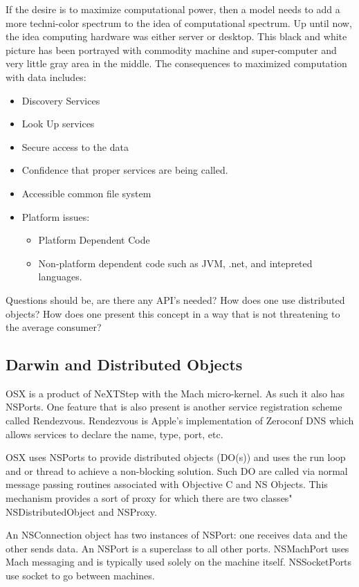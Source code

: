 \documentclass[11pt]{article}
\begin{document}
If the desire is to maximize computational power, then a model needs to add a more techni-color spectrum to the idea of computational spectrum.  Up until now, the idea computing hardware was either server or desktop.   This black and white picture has been portrayed with commodity machine and super-computer and very little gray area in the middle.    The consequences to maximized computation with data includes:
\begin{itemize}
\item Discovery Services 
\item Look Up services 
\item Secure access to the data
\item Confidence that proper services are being called.
\item Accessible common file system
\item Platform issues:
\begin{itemize}
\item Platform Dependent Code
\item Non-platform dependent code such as JVM, .net, and intepreted languages.  
\end{itemize}
\end{itemize}

Questions should be, are there any API's needed?  How does one use distributed objects?  How does one present this concept in a way that is not threatening to the average consumer?

\subsection {Darwin and Distributed Objects}
OSX is a product of NeXTStep with the Mach micro-kernel.  As such it also has NSPorts.  One feature that is also present is another service registration scheme called Rendezvous.    Rendezvous is Apple's implementation of Zeroconf DNS which allows services to declare the name, type, port, etc.  

OSX uses NSPorts to provide distributed objects (DO(s)) and uses the run loop and or thread  to achieve a non-blocking solution.  Such DO are called via normal message passing routines associated with Objective C and NS Objects.  This mechanism provides a sort of proxy for which there are two classes"  NSDistributedObject and NSProxy.  

An NSConnection object has two instances of NSPort: one receives data and the other sends data.   An NSPort is a superclass to all other ports.  NSMachPort uses Mach messaging and is typically used solely on the machine itself.  NSSocketPorts use socket to go between machines.  
\end{document}
